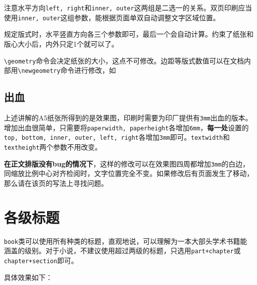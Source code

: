 \documentclass[10pt,openany]{book}
\begin{document}
\begin{sloppypar}
注意水平方向\texttt{left,\ right}和\texttt{inner,\ outer}这两组是二选一的关系。双页印刷应当使用\texttt{inner,\ outer}这组参数，能根据页面单双自动调整文字区域位置。



规定版式时，水平竖直方向各三个参数即可，最后一个会自动计算。约束了纸张和版心大小后，内外只定1个就可以了。

\texttt{\textbackslash{}geometry}命令会决定纸张的大小，这点不可修改。边距等版式数值可以在文档内部用\texttt{\textbackslash{}newgeometry}命令进行修改，如



\subsection{出血}

上述讲解的A5纸张所得到的是效果图，印刷时需要为印厂提供有\texttt{3mm}出血的版本。增加出血很简单，只需要将\texttt{paperwidth,\ paperheight}各增加\texttt{6mm}，\textbf{每一处}设置的\texttt{top,\ bottom,\ inner,\ outer,\ left,\ right}各增加\texttt{3mm}即可。\texttt{textwidth}和\texttt{textheight}两个参数不用改变。

\textbf{在正文排版没有bug的情况下}，这样的修改可以在效果图四周都增加\texttt{3mm}的白边，同缩放比例中心对齐检阅时，文字位置完全不变。如果修改后有页面发生了移动，那么请在该页的写法上寻找问题。

\section{各级标题}
\label{title}

\texttt{book}类可以使用所有种类的标题，直观地说，可以理解为一本大部头学术书籍能涵盖的级别。对于小说，不建议使用超过两级的标题，只选用\texttt{part+chapter}或\texttt{chapter+section}即可。

具体效果如下：


\end{sloppypar}
\end{document}

